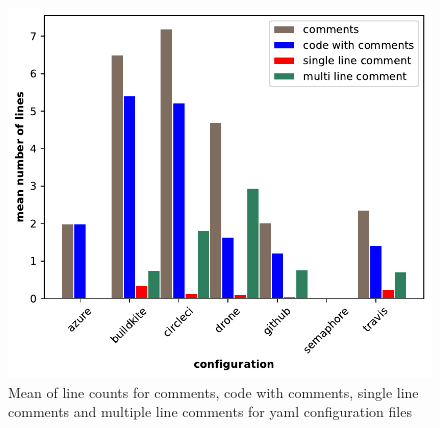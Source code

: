 \documentclass[twoside,12pt,titlepage,a4paper]{article}
\begin{document}
\begin{figure}[!ht]
  \centering
  \includegraphics[width=\textwidth]{../src/results/line structure yaml comments.pdf}
  \caption[alt text]{Mean of line counts for comments, code with comments, single line comments and multiple line comments for yaml configuration files}
  \label{fig:lines_structure_yaml_comments}
\end{figure}
\end{document}
